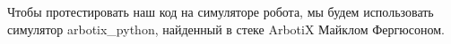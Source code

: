 

Чтобы протестировать наш код на симуляторе робота, мы будем использовать симулятор arbotix\_python, найденный в стеке ArbotiX Майклом Фергюсоном.

